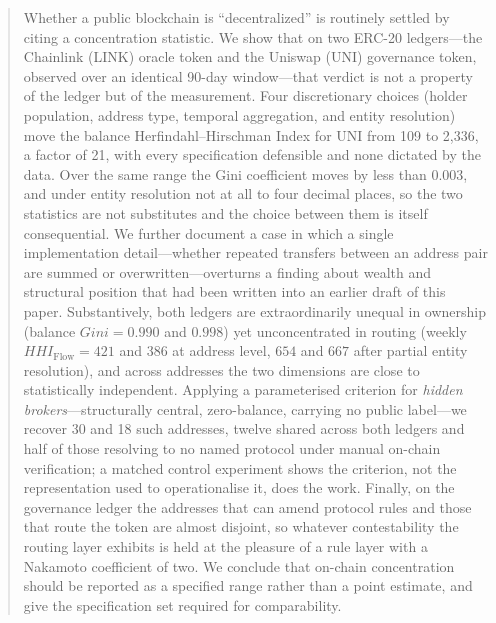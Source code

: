 \documentclass[final,5p,times]{elsarticle}
\begin{document}
\begin{frontmatter}
\begin{abstract}
Whether a public blockchain is ``decentralized'' is routinely settled by
citing a concentration statistic. We show that on two ERC-20 ledgers---the
Chainlink (LINK) oracle token and the Uniswap (UNI) governance token,
observed over an identical 90-day window---that verdict is not a property of
the ledger but of the measurement. Four discretionary choices (holder
population, address type, temporal aggregation, and entity resolution) move
the balance Herfindahl--Hirschman Index for UNI from 109 to 2,336, a factor
of 21, with every specification defensible and none dictated by the data.
Over the same range the Gini coefficient moves by less than $0.003$, and
under entity resolution not at all to four decimal places, so the two
statistics are not substitutes and the choice between them is itself
consequential. We further document a case in which a single
implementation detail---whether repeated transfers between an address pair
are summed or overwritten---overturns a finding about wealth and
structural position that had been written into an earlier draft of this
paper. Substantively, both
ledgers are extraordinarily unequal in ownership (balance $Gini = 0.990$ and
$0.998$) yet unconcentrated in routing (weekly $HHI_{\text{Flow}} = 421$ and
$386$ at address level, $654$ and $667$ after partial entity resolution), and
across addresses the two dimensions are close to statistically independent.
Applying a parameterised criterion for \emph{hidden brokers}---structurally
central, zero-balance, carrying no public label---we recover 30 and 18 such
addresses, twelve shared across both ledgers and half of those resolving to no
named protocol under manual on-chain verification; a matched control
experiment shows the criterion, not the representation used to operationalise
it, does the work. Finally, on the governance ledger the addresses that can
amend protocol rules and those that route the token are almost disjoint, so
whatever contestability the routing layer exhibits is held at the pleasure of
a rule layer with a Nakamoto coefficient of two. We conclude that on-chain
concentration should be reported as a specified range rather than a point
estimate, and give the specification set required for comparability.
\end{abstract}



\end{frontmatter}
\end{document}
